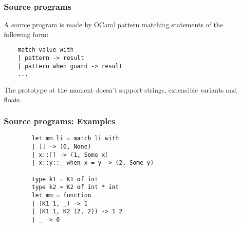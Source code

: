 \documentclass{beamer}
\begin{document}
\begin{frame}[fragile]
  \frametitle{Source programs}
  A source program is made by OCaml pattern matching statements of the following form:
  \begin{lstlisting}
    match value with
    | pattern -> result
    | pattern when guard -> result
    ...
  \end{lstlisting}
  The prototype at the moment doesn't support strings, extensible variants and floats. 
\end{frame}
\begin{frame}[fragile]
  \frametitle{Source programs: Examples}
  \begin{small}
    \hspace{-1em}
    \begin{minipage}{0.36\linewidth}
      \begin{lstlisting}
        let mm li = match li with
        | [] -> (0, None)
        | x::[] -> (1, Some x)
        | x::y::_ when x = y -> (2, Some y)

        type k1 = K1 of int
        type k2 = K2 of int * int
        let mm = function
        | (K1 1, _) -> 1
        | (K1 1, K2 (2, 2)) -> 1 2
        | _ -> 0
      \end{lstlisting}
    \end{minipage}
    \hfill
  \end{small}
  \pause
\end{frame}
\end{document}
